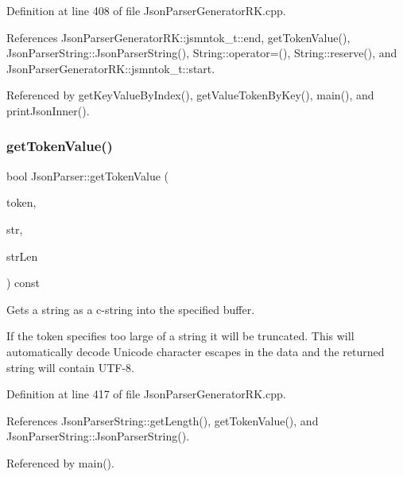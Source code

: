 Definition at line 408 of file Json\+Parser\+Generator\+R\+K.\+cpp.



References Json\+Parser\+Generator\+R\+K\+::jsmntok\+\_\+t\+::end, get\+Token\+Value(), Json\+Parser\+String\+::\+Json\+Parser\+String(), String\+::operator=(), String\+::reserve(), and Json\+Parser\+Generator\+R\+K\+::jsmntok\+\_\+t\+::start.



Referenced by get\+Key\+Value\+By\+Index(), get\+Value\+Token\+By\+Key(), main(), and print\+Json\+Inner().

\mbox{\label{class_json_parser_aa5c0b33d4ddeae1e0d605e166a2a772c}} 
\subsubsection{\texorpdfstring{get\+Token\+Value()}{getTokenValue()}\hspace{0.1cm}{\footnotesize\ttfamily [7/8]}}
{\footnotesize\ttfamily bool Json\+Parser\+::get\+Token\+Value (\begin{DoxyParamCaption}\item[{const \hyperlink{struct_json_parser_generator_r_k_1_1jsmntok__t}{Json\+Parser\+Generator\+R\+K\+::jsmntok\+\_\+t} $\ast$}]{token,  }\item[{char $\ast$}]{str,  }\item[{size\+\_\+t \&}]{str\+Len }\end{DoxyParamCaption}) const}



Gets a string as a c-\/string into the specified buffer. 

If the token specifies too large of a string it will be truncated. This will automatically decode Unicode character escapes in the data and the returned string will contain U\+T\+F-\/8. 

Definition at line 417 of file Json\+Parser\+Generator\+R\+K.\+cpp.



References Json\+Parser\+String\+::get\+Length(), get\+Token\+Value(), and Json\+Parser\+String\+::\+Json\+Parser\+String().



Referenced by main().

\mbox{\label{class_json_parser_a6942f718b6b73d2ff1611f55aec8569c}} 
